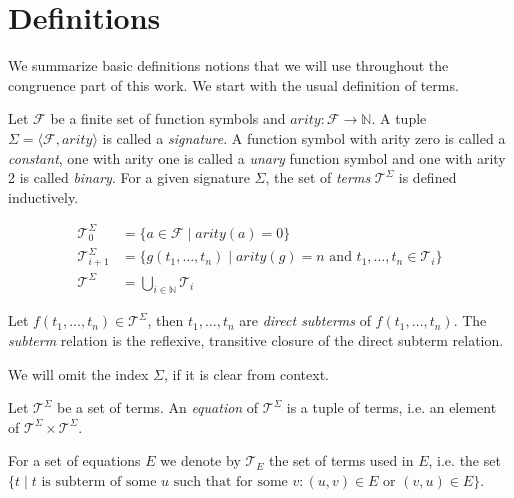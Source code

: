 \section*{Definitions}

We summarize basic definitions notions that we will use throughout the congruence part of this work.
We start with the usual definition of terms.

\begin{definition}

Let $\mathcal{F}$ be a finite set of function symbols and $arity: \mathcal{F} \rightarrow \mathbb{N}$.
A tuple $\Sigma = \langle \mathcal{F}, arity \rangle$ is called a \emph{signature}.
A function symbol with arity zero is called a \emph{constant}, one with arity one is called a \emph{unary} function symbol and one with arity 2 is called \emph{binary}.
For a given signature $\Sigma$, the set of \emph{terms} $\mathcal{T}^{\Sigma}$ is defined inductively.

\begin{align*}
	\mathcal{T}^{\Sigma}_0 &= \{a \in \mathcal{F} \mid arity(a) = 0\}\\
	\mathcal{T}^{\Sigma}_{i+1} &= \{g(t_1,\ldots,t_n) \mid arity(g) = n \text{ and } t_1, \ldots, t_n \in \mathcal{T}_{i}\} \\
	\mathcal{T}^{\Sigma} &= \bigcup_{i\in \mathbb{N}} \mathcal{T}_{i}
\end{align*}

\noindent Let $f(t_1,\ldots,t_n) \in \mathcal{T}^{\Sigma}$, then $t_1,\ldots,t_n$ are \emph{direct subterms} of $f(t_1,\ldots,t_n)$.
The \emph{subterm} relation is the reflexive, transitive closure of the direct subterm relation.

\end{definition}

We will omit the index $\Sigma$, if it is clear from context.

\begin{definition}[Equation]

Let $\mathcal{T}^{\Sigma}$ be a set of terms.
An \emph{equation} of $\mathcal{T}^{\Sigma}$ is a tuple of terms, i.e. an element of $\mathcal{T}^{\Sigma} \times \mathcal{T}^{\Sigma}$.

\end{definition}

For a set of equations $E$ we denote by $\mathcal{T}_E$ the set of terms used in $E$, i.e. the set $\{t \mid t \text{ is subterm of some } u \text{ such that for some } v: (u,v) \in E \text{ or } (v,u) \in E\}$.

